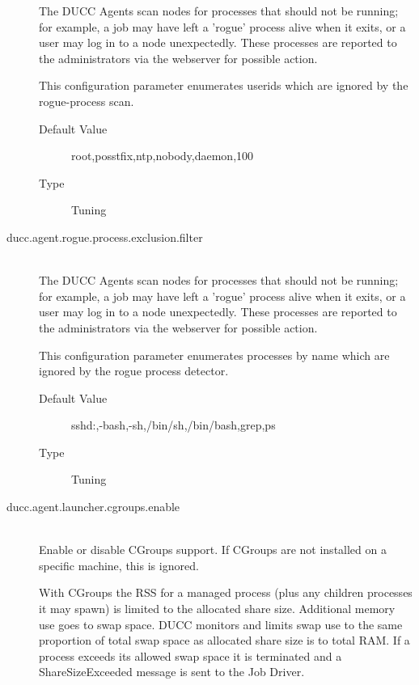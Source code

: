 \begin{description}
            The DUCC Agents scan nodes for processes that should not be running; for example, 
            a job may have left a 'rogue' process alive when it exits, or a user may log in to a node 
            unexpectedly. These processes are reported to the administrators via the webserver for 
            possible action. 

            This configuration parameter enumerates userids which are ignored by the rogue-process 
            scan. 
            \begin{description}
            \item[Default Value] root,posstfix,ntp,nobody,daemon,100 
            \item[Type] Tuning 
            \end{description}
            
          \item[ducc.agent.rogue.process.exclusion.filter] \hfill \\
          \label{itm:props-rogue.process}
            The DUCC Agents scan nodes for processes that should not be running; for example, 
            a job may have left a 'rogue' process alive when it exits, or a user may log in to a node 
            unexpectedly. These processes are reported to the administrators via the webserver for 
            possible action. 

            This configuration parameter enumerates processes by name which are ignored by the 
            rogue process detector. 

            \begin{description}
              \item[Default Value] sshd:,-bash,-sh,/bin/sh,/bin/bash,grep,ps 
              \item[Type] Tuning 
            \end{description}
            

          \item[ducc.agent.launcher.cgroups.enable] \hfill \\
            \label{itm:props-agent.cgroups.enable} Enable or disable CGroups support.
            If CGroups are not installed on a specific machine, this is ignored.

            With CGroups the RSS for a managed process (plus any children processes it may spawn) is
            limited to the allocated share size. Additional memory use goes to swap space. DUCC
            monitors and limits swap use to the same proportion of total swap space as allocated
            share size is to total RAM. If a process exceeds its allowed swap space it is terminated
            and a ShareSizeExceeded message is sent to the Job Driver.


\end{description}
